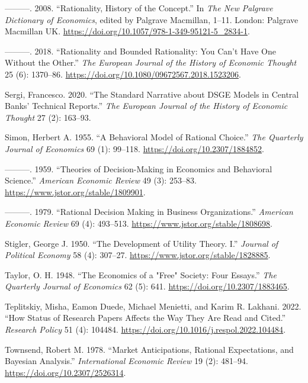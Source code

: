 \documentclass[
]{interact}
\newlength{\cslhangindent}
\newenvironment{CSLReferences}[2] %
 {\begin{list}{}{%
  \setlength{\itemindent}{0pt}
  \setlength{\leftmargin}{0pt}
  \setlength{\parsep}{0pt}
  \ifodd #1
   \setlength{\leftmargin}{\cslhangindent}
   \setlength{\itemindent}{-1\cslhangindent}
  \fi
  \setlength{\itemsep}{#2\baselineskip}}}
 {\end{list}}
\begin{document}
\begin{CSLReferences}{1}{0}
---------. 2008. {``Rationality, {History} of the {Concept}.''} In
\emph{The {New Palgrave Dictionary} of {Economics}}, edited by Palgrave
Macmillan, 1--11. London: Palgrave Macmillan UK.
\url{https://doi.org/10.1057/978-1-349-95121-5_2834-1}.

---------. 2018. {``Rationality and Bounded Rationality: You Can't Have
One Without the Other.''} \emph{The European Journal of the History of
Economic Thought} 25 (6): 1370--86.
\url{https://doi.org/10.1080/09672567.2018.1523206}.

Sergi, Francesco. 2020. {``The Standard Narrative about {DSGE} Models in
Central Banks' Technical Reports.''} \emph{The European Journal of the
History of Economic Thought} 27 (2): 163--93.

Simon, Herbert A. 1955. {``A {Behavioral Model} of {Rational Choice}.''}
\emph{The Quarterly Journal of Economics} 69 (1): 99--118.
\url{https://doi.org/10.2307/1884852}.

---------. 1959. {``Theories of {Decision-Making} in {Economics} and
{Behavioral Science}.''} \emph{American Economic Review} 49 (3):
253--83. \url{https://www.jstor.org/stable/1809901}.

---------. 1979. {``Rational {Decision Making} in {Business
Organizations}.''} \emph{American Economic Review} 69 (4): 493--513.
\url{https://www.jstor.org/stable/1808698}.

Stigler, George J. 1950. {``The {Development} of {Utility Theory}.
{I}.''} \emph{Journal of Political Economy} 58 (4): 307--27.
\url{https://www.jstor.org/stable/1828885}.

Taylor, O. H. 1948. {``The {Economics} of a "{Free}" {Society}: {Four
Essays}.''} \emph{The Quarterly Journal of Economics} 62 (5): 641.
\url{https://doi.org/10.2307/1883465}.

Teplitskiy, Misha, Eamon Duede, Michael Menietti, and Karim R. Lakhani.
2022. {``How Status of Research Papers Affects the Way They Are Read and
Cited.''} \emph{Research Policy} 51 (4): 104484.
\url{https://doi.org/10.1016/j.respol.2022.104484}.

Townsend, Robert M. 1978. {``Market {Anticipations}, {Rational
Expectations}, and {Bayesian Analysis}.''} \emph{International Economic
Review} 19 (2): 481--94. \url{https://doi.org/10.2307/2526314}.


\end{CSLReferences}
\end{document}
